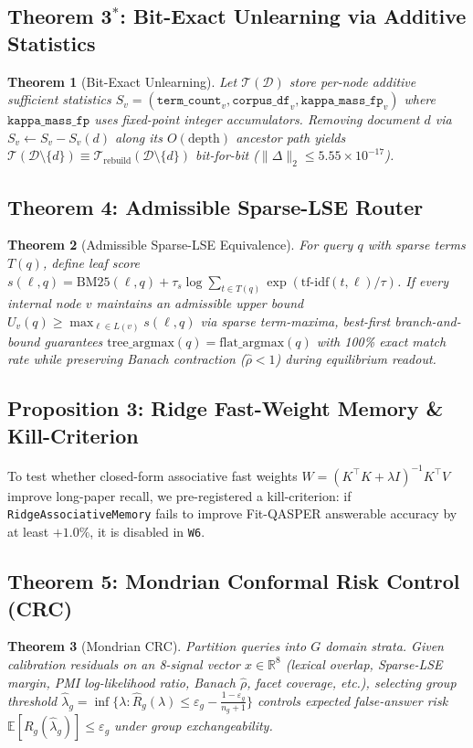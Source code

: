 \documentclass[conference]{IEEEtran}
\newtheorem{theorem}{Theorem}
\begin{document}
\subsection{Theorem 3$^*$: Bit-Exact Unlearning via Additive Statistics}
\begin{theorem}[Bit-Exact Unlearning]
Let $\mathcal{T}(\mathcal{D})$ store per-node additive sufficient statistics $S_v = (\texttt{term\_count}_v, \texttt{corpus\_df}_v, \texttt{kappa\_mass\_fp}_v)$ where $\texttt{kappa\_mass\_fp}$ uses fixed-point integer accumulators. Removing document $d$ via $S_v \leftarrow S_v - S_v(d)$ along its $O(\text{depth})$ ancestor path yields $\mathcal{T}(\mathcal{D} \setminus \{d\}) \equiv \mathcal{T}_{\text{rebuild}}(\mathcal{D} \setminus \{d\})$ bit-for-bit ($\|\Delta\|_2 \le 5.55 \times 10^{-17}$).
\end{theorem}

\subsection{Theorem 4: Admissible Sparse-LSE Router}
\begin{theorem}[Admissible Sparse-LSE Equivalence]
For query $q$ with sparse terms $T(q)$, define leaf score $s(\ell, q) = \text{BM25}(\ell, q) + \tau_s \log \sum_{t \in T(q)} \exp(\text{tf-idf}(t, \ell)/\tau)$. If every internal node $v$ maintains an admissible upper bound $U_v(q) \ge \max_{\ell \in L(v)} s(\ell, q)$ via sparse term-maxima, best-first branch-and-bound guarantees $\text{tree\_argmax}(q) = \text{flat\_argmax}(q)$ with 100\% exact match rate while preserving Banach contraction ($\hat{\rho} < 1$) during equilibrium readout.
\end{theorem}

\subsection{Proposition 3: Ridge Fast-Weight Memory \& Kill-Criterion}
To test whether closed-form associative fast weights $W = (K^\top K + \lambda I)^{-1} K^\top V$ improve long-paper recall, we pre-registered a kill-criterion: if \texttt{RidgeAssociativeMemory} fails to improve Fit-QASPER answerable accuracy by at least $+1.0\%$, it is disabled in \texttt{W6}.

\subsection{Theorem 5: Mondrian Conformal Risk Control (CRC)}
\begin{theorem}[Mondrian CRC]
Partition queries into $G$ domain strata. Given calibration residuals on an 8-signal vector $x \in \mathbb{R}^8$ (lexical overlap, Sparse-LSE margin, PMI log-likelihood ratio, Banach $\hat{\rho}$, facet coverage, etc.), selecting group threshold $\hat{\lambda}_g = \inf\{ \lambda : \hat{R}_g(\lambda) \le \varepsilon_g - \frac{1-\varepsilon_g}{n_g + 1} \}$ controls expected false-answer risk $\mathbb{E}[R_g(\hat{\lambda}_g)] \le \varepsilon_g$ under group exchangeability.
\end{theorem}
\end{document}
